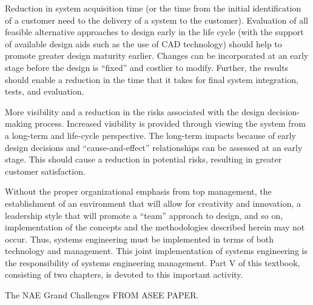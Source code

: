 Reduction in system acquisition time (or the time from the initial identification of a customer need to the delivery of a system to the customer). Evaluation of all feasible alternative approaches to design early in the life cycle (with the support of available design aids such as the use of CAD technology) should help to promote greater design maturity earlier. Changes can be incorporated at an early stage before the design is “fixed” and costlier to modify. Further, the results should enable a reduction in the time that it takes for final system integration, tests, and evaluation.

More visibility and a reduction in the risks associated with the design decision-making process. Increased visibility is provided through viewing the system from a long-term and life-cycle perspective. The long-term impacts because of early design decisions and “cause-and-effect” relationships can be assessed at an early stage. This should cause a reduction in potential risks, resulting in greater customer satisfaction.

Without the proper organizational emphasis from top management, the establishment of an environment that will allow for creativity and innovation, a leadership style that will promote a “team” approach to design, and so on, implementation of the concepts and the methodologies described herein may not occur. Thus, systems engineering must be implemented in terms of both technology and management. This joint implementation of systems engineering is the responsibility of systems engineering management. Part V of this textbook, consisting of two chapters, is devoted to this important activity.

The NAE Grand Challenges FROM ASEE PAPER.

